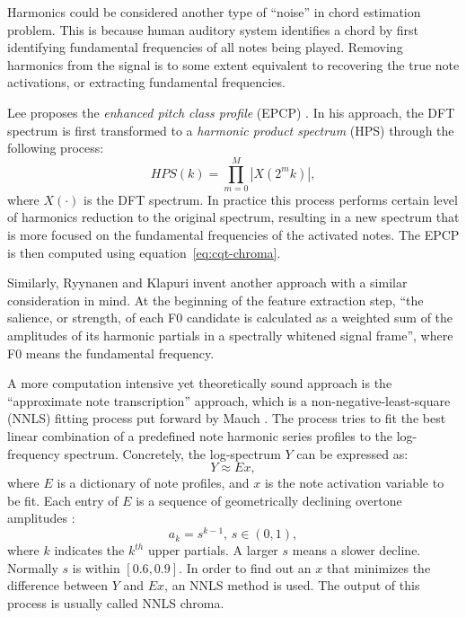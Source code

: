 Harmonics could be considered another type of ``noise'' in chord estimation problem. This is because human auditory system identifies a chord by first identifying fundamental frequencies of all notes being played. Removing harmonics from the signal is to some extent equivalent to recovering the true note activations, or extracting fundamental frequencies.

Lee proposes the {\it enhanced pitch class profile} (EPCP) \cite{lee2006automatic}. In his approach, the DFT spectrum is first transformed to a {\it harmonic product spectrum} (HPS) through the following process:
\begin{equation}
HPS(k) = \prod_{m=0}^M |X(2^mk)|,
\end{equation}
where $X(\cdot)$ is the DFT spectrum. In practice this process performs certain level of harmonics reduction to the original spectrum, resulting in a new spectrum that is more focused on the fundamental frequencies of the activated notes. The EPCP is then computed using equation~\ref{eq:cqt-chroma}.

Similarly, Ryynanen and Klapuri invent another approach \cite{ryynanen2008automatic} with a similar consideration in mind. At the beginning of the feature extraction step, ``the salience, or strength, of each F0 candidate is calculated as a weighted sum of the amplitudes of its harmonic partials in a spectrally whitened signal frame'', where F0 means the fundamental frequency.

A more computation intensive yet theoretically sound approach is the ``approximate note transcription'' approach, which is a non-negative-least-square (NNLS) fitting process put forward by Mauch \cite{mauch2010approximate}. The process tries to fit the best linear combination of a predefined note harmonic series profiles to the log-frequency spectrum. Concretely, the log-spectrum $Y$ can be expressed as:
\begin{equation} \label{eq:2-nnls}
Y \approx Ex,
\end{equation}
where $E$ is a dictionary of note profiles, and $x$ is the note activation variable to be fit. Each entry of $E$ is a sequence of geometrically declining overtone amplitudes \cite{gomez2006tonal_b}:
\begin{equation}
a_k=s^{k-1},\,s\in(0,1),
\end{equation}
where $k$ indicates the $k^{th}$ upper partials. A larger $s$ means a slower decline. Normally $s$ is within $[0.6, 0.9]$. In order to find out an $x$ that minimizes the difference between $Y$ and $Ex$, an NNLS method \cite{lawson1995solving} is used. The output of this process is usually called NNLS chroma.

